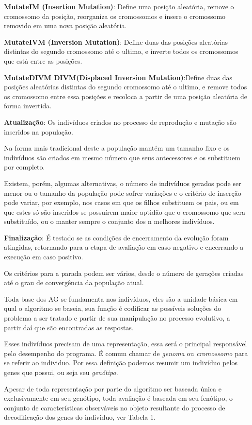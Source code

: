 \textbf{MutateIM (Insertion Mutation)}: Define uma posição aleatória, remove o cromossomo da posição, reorganiza os cromossomos e insere o cromossomo removido em uma nova posição aleatória.

\textbf{MutateIVM (Inversion Mutation)}: Define duas das posições aleatórias distintas do segundo cromossomo até o ultimo, e inverte todos os cromossomos que está entre as posições.

\textbf{MutateDIVM DIVM(Displaced Inversion Mutation)}:Define duas das posições aleatórias distintas do segundo cromossomo até o ultimo, e remove todos os cromossomo entre essa posições e recoloca a partir de uma posição aleatória de forma invertida.

\textbf{Atualização}: Os indivíduos criados no processo de reprodução e mutação são inseridos na população.

Na forma mais tradicional deste a população mantém um tamanho fixo e os indivíduos são criados em mesmo número que seus antecessores e os substituem por completo. 

Existem, porém, algumas alternativas, o número de indivíduos gerados pode ser menor ou o tamanho da população pode sofrer variações e o critério de inserção pode variar, por exemplo, nos casos em que os filhos substituem os pais, ou em que estes só são inseridos se possuírem maior aptidão que o cromossomo que sera substituído, ou o manter sempre o conjunto dos n melhores indivíduos. 

\textbf{Finalização}: É testado se as condições de encerramento da evolução foram atingidas, retornando para a etapa de avaliação em caso negativo e encerrando a execução em caso positivo.

Os critérios para a parada podem ser vários, desde o número de gerações criadas até o grau de convergência da população atual.


Toda base dos AG se fundamenta nos indivíduos, eles são a unidade básica em qual o algoritmo se baseia, sua função é codificar as possíveis soluções do problema a ser tratado e partir de sua manipulação no processo evolutivo, a partir daí que são encontradas as respostas.

Esses indivíduos precisam de uma representação, essa será o principal responsável pelo desempenho do programa. É comum chamar de \textit{genoma} ou \textit{cromossomo} para se referir ao individuo. Por essa definição podemos resumir um indivíduo pelos genes que possui, ou seja seu \textit{genótipo}.

Apesar de toda representação por parte do algoritmo ser baseada única e exclusivamente em seu genótipo, toda avaliação é baseada em seu fenótipo, o conjunto de características observáveis no objeto resultante do processo de decodificação dos genes do individuo, ver Tabela 1.


